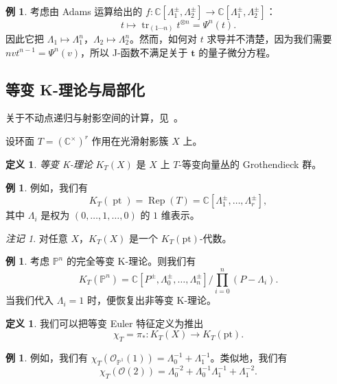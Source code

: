 \documentclass{amsart}
\theoremstyle{definition}
\newtheorem{defn}[thm]{定义}
\newtheorem{exm}[thm]{例}
\theoremstyle{remark}
\newtheorem{rmk}[thm]{注记}
\theoremstyle{plain}
\theoremstyle{definition}
\theoremstyle{remark}
\newcommand{\C}{\mathbb{C}}
\renewcommand{\P}{\mathbb{P}}
\newcommand{\mc}[1]{\mathcal{#1}}
\newcommand{\mr}[1]{\mathrm{#1}}
\newcommand{\on}[1]{\operatorname{#1}}
\newcommand{\1}{\mathbf{1}}
\newcommand{\2}{\mathbf{2}}
\newcommand{\3}{\mathbf{3}}
\begin{document}
\begin{exm}
    考虑由 Adams 运算给出的 \(f \colon \C[\Lambda_1^{\pm}, \Lambda_2^{\pm}] \to \C[\Lambda_1^{\pm}, \Lambda_2^{\pm}]\)：
    \[ t \mapsto \on{tr}_{(1\cdots n)} t^{\otimes n} = \Psi^n (t). \]
    因此它把 \(\Lambda_1 \mapsto \Lambda_1^n\)，\(\Lambda_2 \mapsto \Lambda_2^n\)。然而，如何对 \(t\) 求导并不清楚，因为我们需要 \(nv t^{n-1} = \Psi^n(v)\)，所以 J-函数不满足关于 \(\mathbf{t}\) 的量子微分方程。
\end{exm}

\subsection{等变 K-理论与局部化}%
\label{sub:Equivariant K-theory and localization}

关于不动点递归与射影空间的计算，见~\cite{GiventalK2}。

设环面 \(T = (\C^{\times})^r\) 作用在光滑射影簇 \(X\) 上。

\begin{defn}
    \textit{等变 K-理论} \(K_T(X)\) 是 \(X\) 上 \(T\)-等变向量丛的 Grothendieck 群。
\end{defn}

\begin{exm}
    例如，我们有
    \[ K_T(\on{pt}) = \on{Rep}(T) = \C[\Lambda_1^{\pm}, \ldots, \Lambda_r^{\pm}], \]
    其中 \(\Lambda_i\) 是权为 \((0, \ldots, 1, \ldots, 0)\) 的 \(1\) 维表示。
\end{exm}

\begin{rmk}
    对任意 \(X\)，\(K_T(X)\) 是一个 \(K_T(\mr{pt})\)-代数。
\end{rmk}

\begin{exm}
    考虑 \(\P^n\) 的完全等变 K-理论。则我们有
    \[ K_T(\P^n) = \C[P^{\pm}, \Lambda_0^{\pm}, \ldots, \Lambda_n^{\pm}] \big/ \prod_{i=0}^n (P-\Lambda_i). \]
    当我们代入 \(\Lambda_i = 1\) 时，便恢复出非等变 K-理论。
\end{exm}

\begin{defn}
    我们可以把等变 Euler 特征定义为推出
    \[ \chi_T = \pi_* \colon K_T(X) \to K_T(\mr{pt}). \]
\end{defn}

\begin{exm}
    例如，我们有 \(\chi_T(\mc{O}_{\P^1}(1)) = \Lambda_0^{-1} + \Lambda_1^{-1}\)。类似地，我们有
    \[ \chi_T(\mc{O}(2)) = \Lambda_0^{-2} + \Lambda_0^{-1} \Lambda_1^{-1} + \Lambda_1^{-2}. \]
\end{exm}
\end{document}
